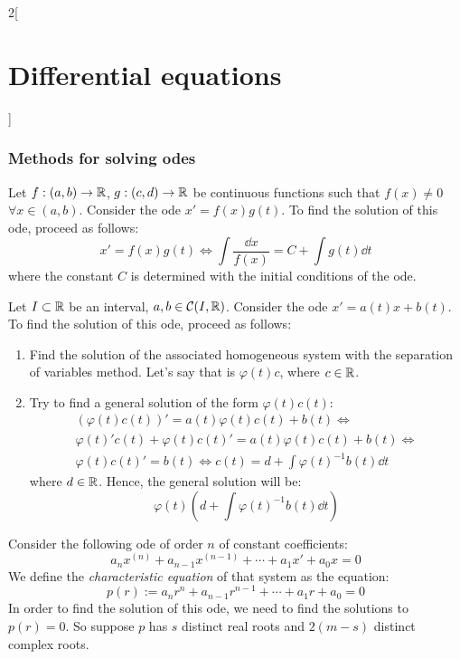 \documentclass[../../../main_math.tex]{subfiles}
\begin{document}
\begin{multicols}{2}[\section{Differential equations}]
  \subsubsection{Methods for solving odes}
  \begin{method}
    Let $f:(a,b)\rightarrow\mathbb{R}$, $g:(c,d)\rightarrow\mathbb{R}$ be continuous functions such that $f(x)\ne 0$ $\forall x\in (a,b)$. Consider the ode $x'=f(x)g(t)$. To find the solution of this ode, proceed as follows:
    $$x'=f(x)g(t)\iff \int\frac{\dd{x}}{f(x)}=C+\int g(t)\dd{t}$$ where the constant $C$ is determined with the initial conditions of the ode.
  \end{method}
  \begin{method}
    Let $I\subset \mathbb{R}$ be an interval, $a,b\in\mathcal{C}(I,\mathbb{R})$. Consider the ode $x'=a(t)x+b(t)$. To find the solution of this ode, proceed as follows:
    \begin{enumerate}
      \item Find the solution of the associated homogeneous system with the separation of variables method. Let's say that is $\varphi(t)c$, where $c\in\mathbb{R}$.
      \item Try to find a general solution of the form $\varphi(t)c(t)$:
            \begin{multline*}
              \left(\varphi(t)c(t)\right)'=a(t)\varphi(t)c(t)+b(t)\iff\\\varphi(t)'c(t)+\varphi(t)c(t)'=a(t)\varphi(t)c(t)+b(t)\iff\\\varphi(t)c(t)'=b(t)\iff c(t)=d+\int\varphi(t)^{-1}b(t)\dd{t}
            \end{multline*}
            where $d\in\mathbb{R}$. Hence, the general solution will be: $$\varphi(t)\left(d+\int\varphi(t)^{-1}b(t)\dd{t}\right)$$
    \end{enumerate}
  \end{method}
  \begin{method}
    Consider the following ode of order $n$ of constant coefficients:
    \begin{equation}\label{DE_char}
      a_n x^{(n)} + a_{n-1}x^{(n-1)} + \cdots + a_1 x' + a_0 x = 0
    \end{equation}
    We define the \emph{characteristic equation} of that system as the equation: $$p(r):=a_n r^n + a_{n-1}r^{n-1} + \cdots + a_1 r + a_0 = 0$$
    In order to find the solution of this ode, we need to find the solutions to $p(r)=0$. So suppose $p$ has $s$ distinct real roots and $2(m-s)$ distinct complex roots.

\end{method}
\end{multicols}
\end{document}

